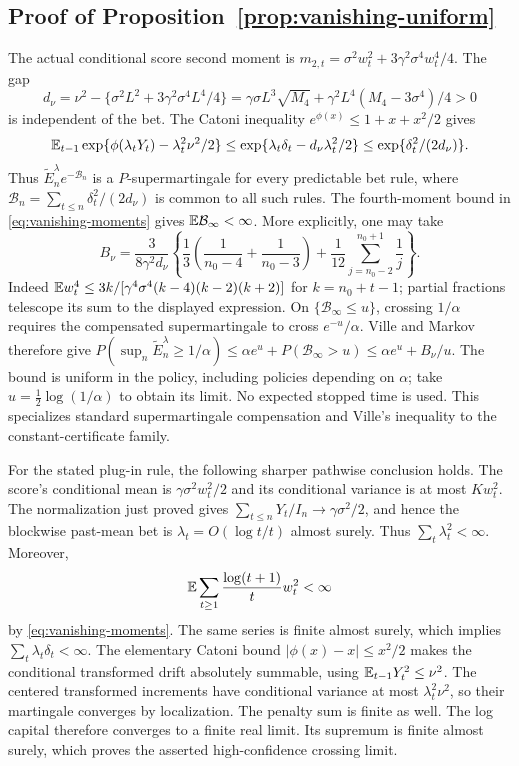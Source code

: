 \subsection{Proof of Proposition~\ref{prop:vanishing-uniform}}
The actual conditional score second moment is
$m_{2,t}=\sigma^2w_t^2+3\gamma^2\sigma^4w_t^4/4$. The gap
\[
 d_\nu=\nu^2-\{\sigma^2L^2+3\gamma^2\sigma^4L^4/4\}
 =\gamma\sigma L^3\sqrt{M_4}
     +\gamma^2L^4(M_4-3\sigma^4)/4>0
\]
is independent of the bet. The Catoni inequality
$e^{\phi(x)}\le1+x+x^2/2$ gives
\[
 \mathbb E_{t-1}\exp\{\phi(\lambda_tY_t)-\lambda_t^2\nu^2/2\}
 \le\exp\{\lambda_t\delta_t-d_\nu\lambda_t^2/2\}
 \le\exp\{\delta_t^2/(2d_\nu)\}.
\]
Thus $\widetilde E_n^{\lambda}e^{-\mathcal B_n}$ is a $P$-supermartingale for every
predictable bet rule, where $\mathcal B_n=\sum_{t\le n}\delta_t^2/(2d_\nu)$ is common
to all such rules. The fourth-moment bound in
\eqref{eq:vanishing-moments} gives $\mathbb E\mathcal B_\infty<\infty$.
More explicitly, one may take
\[
 B_\nu=\frac3{8\gamma^2d_\nu}
 \left\{\frac13\left(\frac1{n_0-4}+\frac1{n_0-3}\right)
       +\frac1{12}\sum_{j=n_0-2}^{n_0+1}\frac1j\right\}.
\]
Indeed $\mathbb E w_t^4\le3k/[\gamma^4\sigma^4(k-4)(k-2)(k+2)]$ for
$k=n_0+t-1$; partial fractions telescope its sum to the displayed expression.
On $\{\mathcal B_\infty\le u\}$, crossing $1/\alpha$ requires the compensated
supermartingale to cross $e^{-u}/\alpha$. Ville and Markov therefore give
$P(\sup_n\widetilde E_n^{\lambda}\ge1/\alpha)
\le\alpha e^u+P(\mathcal B_\infty>u)\le\alpha e^u+B_\nu/u$.
The bound is uniform in the policy, including policies depending on $\alpha$;
take $u=\frac12\log(1/\alpha)$ to obtain its limit. No expected stopped time
is used. This specializes standard supermartingale compensation and Ville's
inequality to the constant-certificate family.

For the stated plug-in rule, the following sharper pathwise conclusion holds.
The score's conditional mean is $\gamma\sigma^2w_t^2/2$ and its conditional
variance is at most $K w_t^2$. The normalization just proved gives
$\sum_{t\le n}Y_t/I_n\to\gamma\sigma^2/2$, and hence the blockwise
past-mean bet is $\lambda_t=O(\log t/t)$ almost surely. Thus
$\sum_t\lambda_t^2<\infty$. Moreover,
\[
 \mathbb E\sum_{t\ge1}\frac{\log(t+1)}t w_t^2<\infty
\]
by \eqref{eq:vanishing-moments}. The same series is finite almost surely,
which implies $\sum_t\lambda_t\delta_t<\infty$. The elementary Catoni bound
$|\phi(x)-x|\le x^2/2$ makes the conditional transformed drift absolutely
summable, using $\mathbb E_{t-1}Y_t^2\le\nu^2$. The centered transformed increments
have conditional variance at most $\lambda_t^2\nu^2$, so their martingale
converges by localization. The penalty sum is finite as well. The log capital
therefore converges to a finite real limit. Its supremum is finite almost
surely, which proves the asserted high-confidence crossing limit.

